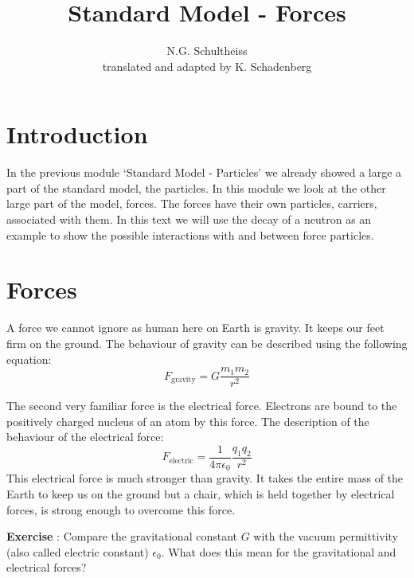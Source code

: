 


\author{N.G. Schultheiss \\ translated and adapted by K. Schadenberg}
\date{}
\title{Standard Model - Forces}



\maketitle

\section{Introduction}
In the previous module `Standard Model - Particles' we already showed a large a part of the standard model, the particles. In this module we look at the other large part of the model, forces. The forces have their own particles, carriers, associated with them. In this text we will use the decay of a neutron as an example to show the possible interactions with and between force particles.

\section{Forces}
A force we cannot ignore as human here on Earth is gravity. It keeps our feet firm on the ground. The behaviour of gravity can be described using the following equation:
\begin{equation}
F_{\mbox{gravity}} = G \frac{m_1 m_2}{r^2}
\end{equation}

The second very familiar force is the electrical force. Electrons are bound to the positively charged nucleus of an atom by this force. The description of the behaviour of the electrical force:
\begin{equation}
F_{\mbox{electric}} = \frac{1}{4 \pi \epsilon_0} \frac{q_1 q_2}{r^2}
\end{equation}
This electrical force is much stronger than gravity. It takes the entire mass of the Earth to keep us on the ground but a chair, which is held together by electrical forces, is strong enough to overcome this force.

\begin{shaded}
\textbf{Exercise \theExercise {}} : Compare the gravitational constant $G$ with the vacuum permittivity (also called electric constant) $\epsilon_0$. What does this mean for the gravitational and electrical forces?\end{shaded}


